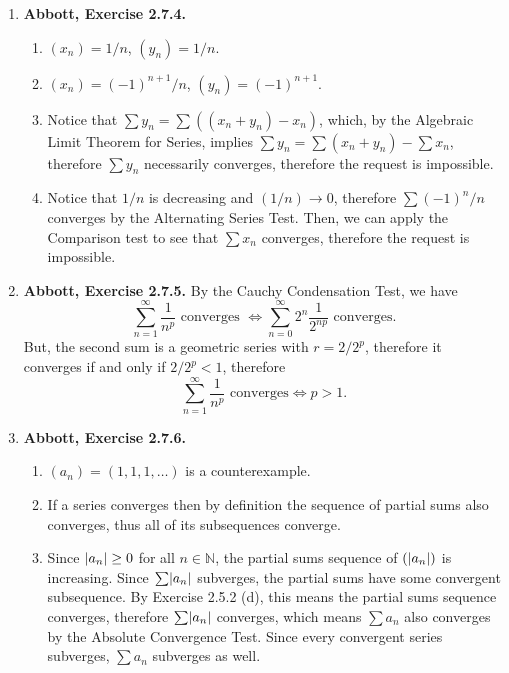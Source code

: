 \documentclass{article}
\DeclarePairedDelimiter\abs{\lvert}{\rvert}
\newcommand{\N}{\mathbb{N}}
\newcommand{\ra}{\rightarrow}
\newcommand{\exc}[2][Abbott]{\item \textbf{#1, Exercise #2.}}
\begin{document}
\begin{enumerate}
    \exc{2.7.4}
    \begin{enumerate}
        \item $(x_n) = 1/n$, $(y_n) = 1/n$.
        
        \item $(x_n) = (-1)^{n+1}/n$, $(y_n) = (-1)^{n+1}$.
        
        \item Notice that $\sum y_n = \sum ((x_n + y_n) - x_n)$, which, by the Algebraic Limit Theorem for Series, implies $\sum y_n = \sum  (x_n + y_n) - \sum x_n$, therefore $\sum y_n$ necessarily converges, therefore the request is impossible.
        
        \item Notice that $1/n$ is decreasing and $(1/n) \ra 0$, therefore $\sum (-1)^n/n$ converges by the Alternating Series Test. Then, we can apply the Comparison test to see that $\sum x_n$ converges, therefore the request is impossible.
    \end{enumerate}
    
    \exc{2.7.5} By the Cauchy Condensation Test, we have 
    \begin{equation*}
        \sum_{n=1}^\infty \frac{1}{n^p} \text{ converges } \iff 
        \sum_{n=0}^\infty 2^n \frac{1}{2^{n p}} \text{ converges.} 
    \end{equation*} But, the second sum is a geometric series with $r = 2/2^p$, therefore it converges if and only if $2/2^p < 1$, therefore 
    \begin{equation*}
        \sum_{n=1}^\infty \frac{1}{n^p} \text{ converges} \iff p > 1.
    \end{equation*}
    
    \exc{2.7.6}
    \begin{enumerate}
        \item $(a_n) = (1,1,1,\dots)$ is a counterexample.
        
        \item If a series converges then by definition the sequence of partial sums also converges, thus all of its subsequences converge.
        
        \item Since $\abs*{a_n} \geq 0$ for all $n \in \N$, the partial sums sequence of $(\abs*{a_n})$ is increasing. Since $\sum \abs*{a_n}$ subverges, the partial sums have some convergent subsequence. By Exercise 2.5.2 (d), this means the partial sums sequence converges, therefore $\sum \abs*{a_n}$ converges, which means $\sum a_n$ also converges by the Absolute Convergence Test. Since every convergent series subverges, $\sum a_n$ subverges as well.
        

\end{enumerate}
\end{enumerate}
\end{document}
